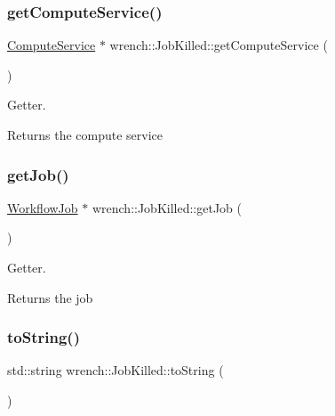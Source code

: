 \subsubsection{\texorpdfstring{get\+Compute\+Service()}{getComputeService()}}
{\footnotesize\ttfamily \hyperlink{classwrench_1_1_compute_service}{Compute\+Service} $\ast$ wrench\+::\+Job\+Killed\+::get\+Compute\+Service (\begin{DoxyParamCaption}{ }\end{DoxyParamCaption})}



Getter. 

\begin{DoxyReturn}{Returns}
the compute service 
\end{DoxyReturn}
\mbox{\label{classwrench_1_1_job_killed_a12b56e54f07217a9b0a3f3f67b001132}} 
\subsubsection{\texorpdfstring{get\+Job()}{getJob()}}
{\footnotesize\ttfamily \hyperlink{classwrench_1_1_workflow_job}{Workflow\+Job} $\ast$ wrench\+::\+Job\+Killed\+::get\+Job (\begin{DoxyParamCaption}{ }\end{DoxyParamCaption})}



Getter. 

\begin{DoxyReturn}{Returns}
the job 
\end{DoxyReturn}
\mbox{\label{classwrench_1_1_job_killed_aa9c6b749d16db4a313ffdd83629f1c76}} 
\subsubsection{\texorpdfstring{to\+String()}{toString()}}
{\footnotesize\ttfamily std\+::string wrench\+::\+Job\+Killed\+::to\+String (\begin{DoxyParamCaption}{ }\end{DoxyParamCaption})\hspace{0.3cm}{\ttfamily [virtual]}}



